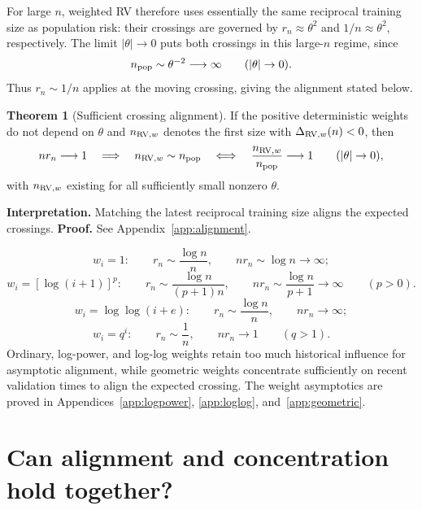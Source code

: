 \documentclass[11pt]{article}
\theoremstyle{definition}
\newtheorem{theorem}{Theorem}[section]
\begin{document}
For large $n$, weighted RV therefore uses essentially the same
reciprocal training size as population risk: their crossings are
governed by $r_n\approx\theta^2$ and $1/n\approx\theta^2$, respectively.
The limit $|\theta|\to0$ puts both crossings in this large-$n$ regime,
since
\[
n_{\rm pop}\sim\theta^{-2}\longrightarrow\infty
\qquad(|\theta|\to0).
\]
Thus $r_n\sim1/n$ applies at the moving crossing, giving the
alignment stated below.

\begin{theorem}[Sufficient crossing alignment]\label{thm:alignment}
If the positive deterministic weights do not depend on $\theta$
and $n_{{\rm RV},w}$ denotes the first size with
$\Delta_{{\rm RV},w}(n)<0$, then
\[
nr_n\longrightarrow1\quad\Longrightarrow\quad
n_{{\rm RV},w}\sim n_{\rm pop}
\quad\Longleftrightarrow\quad
\frac{n_{{\rm RV},w}}{n_{\rm pop}}\longrightarrow1
\qquad(|\theta|\to0),
\]
with $n_{{\rm RV},w}$ existing for all sufficiently small nonzero $\theta$.
\end{theorem}
\noindent\textbf{Interpretation.} Matching the latest reciprocal
training size aligns the expected crossings.
\textbf{Proof.} See Appendix~\ref{app:alignment}.

\[
w_i=1:\qquad r_n\sim\frac{\log n}{n},\qquad
nr_n\sim\log n\to\infty;
\]
\[
w_i=[\log(i+1)]^p:\qquad r_n\sim\frac{\log n}{(p+1)n},\qquad
nr_n\sim\frac{\log n}{p+1}\to\infty
\qquad(p>0).
\]
\[
w_i=\log\log(i+e):\qquad r_n\sim\frac{\log n}{n},\qquad
nr_n\to\infty;
\]
\[
w_i=q^i:\qquad r_n\sim\frac1n,\qquad nr_n\to1
\qquad(q>1).
\]
Ordinary, log-power, and log-log weights retain too much historical
influence for asymptotic alignment, while geometric weights concentrate
sufficiently on recent validation times to align the expected crossing.
The weight asymptotics are proved in Appendices~\ref{app:logpower},
\ref{app:loglog}, and~\ref{app:geometric}.

\section{Can alignment and concentration hold together?}
\end{document}
